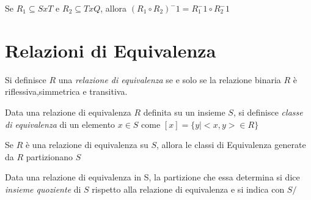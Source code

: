 \begin{thm}
Se $R_1 \subseteq S x T$ e $R_2 \subseteq T x Q$, allora $(R_1 \circ R_2)^-1 = R_1^-1 \circ R_2^-1$
\end{thm}




\section{Relazioni di Equivalenza}
Si definisce $R$ una \emph{relazione di equivalenza} se e solo se la relazione binaria
$R$ è riflessiva,simmetrica e transitiva.


Data una relazione di equivalenza $R$ definita su un insieme $S$, si definisce
\emph{classe di equivalenza} di un elemento $x \in S$ come $[x] = \{y | <x,y> \in R \}$

\begin{thm}
Se $R$ è una relazione di equivalenza su $S$, allora le classi di Equivalenza
generate da $R$ partizionano $S$
\end{thm}

Data una relazione di equivalenza in S, la partizione che essa determina si dice
\emph{insieme quoziente} di $S$ rispetto alla relazione di equivalenza e si indica con $S/$


